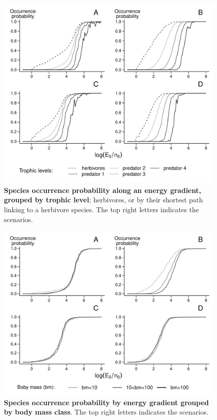 \begin{figure}[htbp]
\centering
\includegraphics{fig/fig2.pdf}
\caption{\textbf{Species occurrence probability along an energy
gradient, grouped by trophic level}; herbivores, or by their shortest
path linking to a herbivore species. The top right letters indicates the
scenarios.\label{fig:etib2}}
\end{figure}

\begin{figure}[htbp]
\centering
\includegraphics{fig/fig3.pdf}
\caption{\textbf{Species occurrence probability by energy gradient
grouped by body mass class}. The top right letters indicates the
scenarios.\label{fig:etib3}}
\end{figure}

